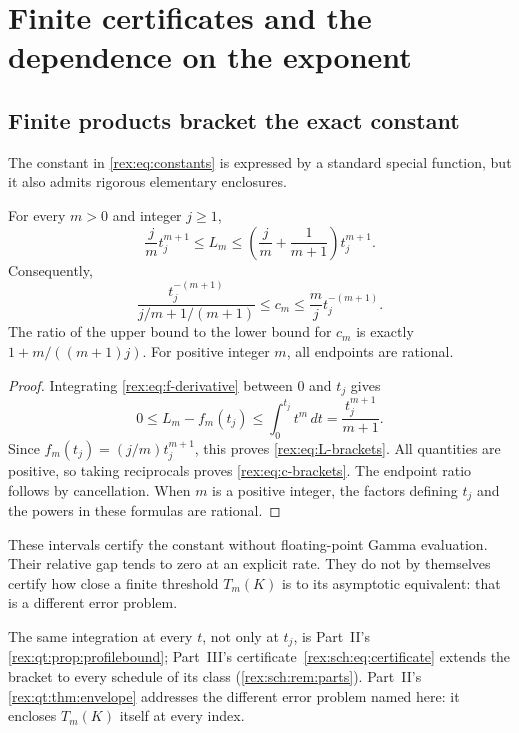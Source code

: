 \section{Finite certificates and the dependence on the exponent}\label{rex:sec:certificates}

\subsection{Finite products bracket the exact constant}

The constant in \cref{rex:eq:constants} is expressed by a standard special
function, but it also admits rigorous elementary enclosures.

\begin{proposition}\label{rex:prop:certificates}
For every $m>0$ and integer $j\geq1$,
\begin{equation}\label{rex:eq:L-brackets}
 \frac jm t_j^{m+1}\leq L_m\leq
 \left(\frac jm+\frac1{m+1}\right)t_j^{m+1}.
\end{equation}
Consequently,
\begin{equation}\label{rex:eq:c-brackets}
 \frac{t_j^{-(m+1)}}{j/m+1/(m+1)}
 \leq c_m\leq\frac mj t_j^{-(m+1)}.
\end{equation}
The ratio of the upper bound to the lower bound for $c_m$ is exactly
$1+m/((m+1)j)$. For positive integer $m$, all endpoints are rational.
\end{proposition}

\begin{proof}
Integrating \cref{rex:eq:f-derivative} between $0$ and $t_j$ gives
\[
 0\leq L_m-f_m(t_j)\leq\int_0^{t_j}t^m\,dt
 =\frac{t_j^{m+1}}{m+1}.
\]
Since $f_m(t_j)=(j/m)t_j^{m+1}$, this proves
\cref{rex:eq:L-brackets}. All quantities are positive, so taking
reciprocals proves \cref{rex:eq:c-brackets}. The endpoint ratio follows
by cancellation. When $m$ is a positive integer, the factors defining
$t_j$ and the powers in these formulas are rational.
\end{proof}

These intervals certify the constant without floating-point Gamma
evaluation. Their relative gap tends to zero at an explicit rate.
They do not by themselves certify how close a finite threshold
$T_m(K)$ is to its asymptotic equivalent: that is a different error
problem.

\begin{writenote}
The same integration at every $t$, not only at $t_j$, is Part~II's
\cref{rex:qt:prop:profilebound}; Part~III's
certificate~\eqref{rex:sch:eq:certificate} extends the bracket to every
schedule of its class (\cref{rex:sch:rem:parts}). Part~II's
\cref{rex:qt:thm:envelope} addresses the different error problem named
here: it encloses $T_m(K)$ itself at every index.
\end{writenote}

